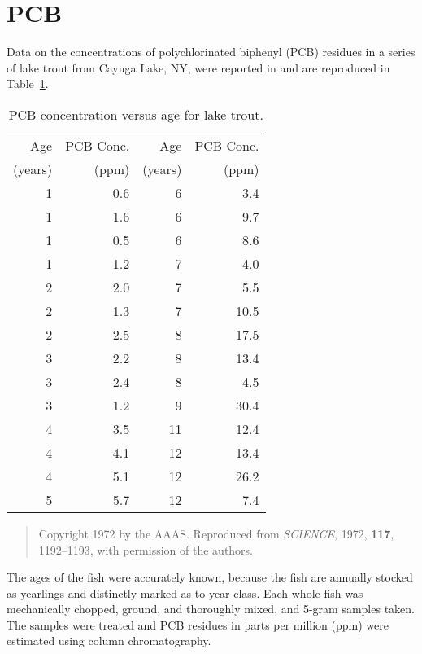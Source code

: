
\section{PCB}

Data on the concentrations of polychlorinated biphenyl (PCB) residues in
a series of lake trout from Cayuga Lake, NY, were reported in
and are reproduced in Table~\ref{atbl:pcb}.
\begin{table}
  \begin{center}
    \caption{\label{atbl:pcb}
    PCB concentration versus age for lake trout.  }
    \begin{tabular}{r r r r}\hline
      Age&PCB Conc.&Age&PCB Conc.\\
      (years)&(ppm)&(years)&(ppm)\\ \hline
      1&0.6&6&3.4\\
      1&1.6&6&9.7\\
      1&0.5&6&8.6\\
      1&1.2&7&4.0\\
      2&2.0&7&5.5\\
      2&1.3&7&10.5\\
      2&2.5&8&17.5\\
      3&2.2&8&13.4\\
      3&2.4&8&4.5\\
      3&1.2&9&30.4\\
      4&3.5&11&12.4\\
      4&4.1&12&13.4\\
      4&5.1&12&26.2\\
      5&5.7&12&7.4\\ \hline
    \end{tabular}
  \end{center}
  \begin{quote}\small
    Copyright 1972 by the AAAS.
    Reproduced from {\em SCIENCE}, 1972, {\bf 117}, 1192--1193,
    with permission of the authors.
  \end{quote}
\end{table}
The ages of the fish were accurately known, because the fish are
annually stocked as yearlings and distinctly marked as to year class.
Each whole fish was mechanically chopped, ground, and thoroughly mixed,
and 5-gram samples taken.
The samples were treated and PCB residues in parts per million (ppm)
were estimated using column chromatography.

